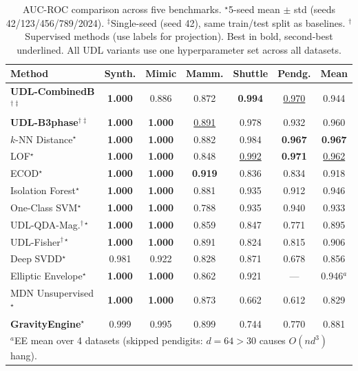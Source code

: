 \documentclass{article}
\begin{document}
\begin{table}[t]
\centering
\caption{AUC-ROC comparison across five benchmarks. $^\star$5-seed mean $\pm$ std (seeds 42/123/456/789/2024). $^\ddagger$Single-seed (seed 42), same train/test split as baselines. $^\dagger$Supervised methods (use labels for projection). Best in bold, second-best underlined. All UDL variants use one hyperparameter set across all datasets.}
\label{tab:main_results}
\begin{tabular}{@{}lcccccc@{}}
\toprule
\textbf{Method} & \textbf{Synth.} & \textbf{Mimic} & \textbf{Mamm.} & \textbf{Shuttle} & \textbf{Pendg.} & \textbf{Mean} \\
\midrule
\textbf{UDL-CombinedB$^{\dagger\ddagger}$} & \textbf{1.000} & 0.886 & 0.872 & \textbf{0.994} & \underline{0.970} & 0.944 \\
\textbf{UDL-B3phase$^{\dagger\ddagger}$} & \textbf{1.000} & \textbf{1.000} & \underline{0.891} & 0.978 & 0.932 & 0.960 \\
$k$-NN Distance$^\star$ & \textbf{1.000} & \textbf{1.000} & 0.882 & 0.984 & \textbf{0.967} & \textbf{0.967} \\
LOF$^\star$ & \textbf{1.000} & \textbf{1.000} & 0.848 & \underline{0.992} & \textbf{0.971} & \underline{0.962} \\
ECOD$^\star$ & \textbf{1.000} & \textbf{1.000} & \textbf{0.919} & 0.836 & 0.834 & 0.918 \\
Isolation Forest$^\star$ & \textbf{1.000} & \textbf{1.000} & 0.881 & 0.935 & 0.912 & 0.946 \\
One-Class SVM$^\star$ & \textbf{1.000} & \textbf{1.000} & 0.788 & 0.935 & 0.940 & 0.933 \\
UDL-QDA-Mag.$^{\dagger\star}$ & \textbf{1.000} & \textbf{1.000} & 0.859 & 0.847 & 0.771 & 0.895 \\
UDL-Fisher$^{\dagger\star}$ & \textbf{1.000} & \textbf{1.000} & 0.891 & 0.824 & 0.815 & 0.906 \\
Deep SVDD$^\star$ & 0.981 & 0.922 & 0.828 & 0.871 & 0.678 & 0.856 \\
Elliptic Envelope$^\star$ & \textbf{1.000} & \textbf{1.000} & 0.862 & 0.921 & --- & 0.946$^a$ \\
\midrule
MDN Unsupervised$^\star$ & \textbf{1.000} & \textbf{1.000} & 0.873 & 0.662 & 0.612 & 0.829 \\
\textbf{GravityEngine}$^\star$ & 0.999 & 0.995 & 0.899 & 0.744 & 0.770 & 0.881 \\
\bottomrule
\multicolumn{7}{l}{\footnotesize $^a$EE mean over 4 datasets (skipped pendigits: $d{=}64 > 30$ causes $O(nd^3)$ hang).}
\end{tabular}
\end{table}
\end{document}
